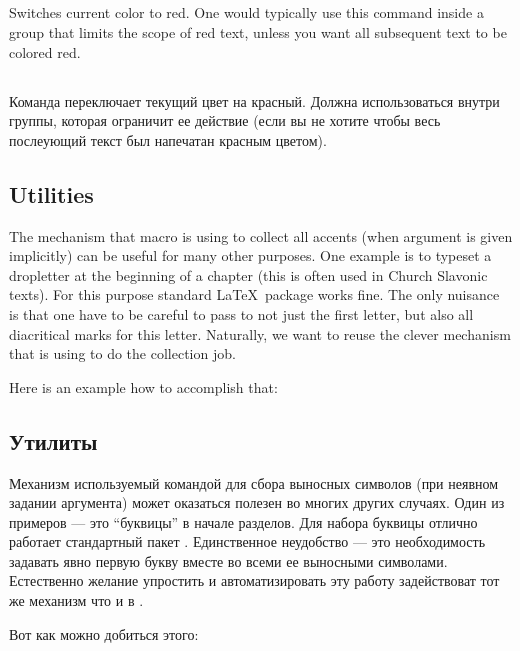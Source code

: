\begin{EN}

\subsection{}
Switches current color to red. One would typically use this command inside a group that limits the scope of red text, unless
you want all subsequent text to be colored red.
\end{EN}

\begin{RU}

\subsection{}
Команда переключает текущий цвет на красный. Должна использоваться внутри группы, которая ограничит ее действие (если вы не хотите
чтобы весь послеующий текст был напечатан красным цветом).
\end{RU}

\begin{EN}
\section{Utilities}
The mechanism that  macro is using to collect all accents (when argument is given implicitly) can be useful for
many other purposes. One example is to typeset a dropletter at the beginning of a chapter (this is often used in Church Slavonic
texts). For this purpose standard \LaTeX\ package  works fine. The only nuisance is that one have to be careful to
pass to  not just the first letter, but also all diacritical marks for this letter. Naturally, we want to reuse the
clever mechanism that  is using to do the collection job.

Here is an example how to accomplish that:
\end{EN}

\begin{RU}
\section{Утилиты}
Механизм используемый командой  для сбора выносных символов (при неявном задании аргумента) может оказаться полезен
во многих других случаях. Один из примеров --- это ``буквицы'' в начале разделов. Для набора буквицы отлично работает стандартный
пакет . Единственное неудобство --- это необходимость задавать явно первую букву вместе во всеми ее выносными символами.
Естественно желание упростить и автоматизировать эту работу задействоват тот же механизм что и в .

Вот как можно добиться этого:
\end{RU}

